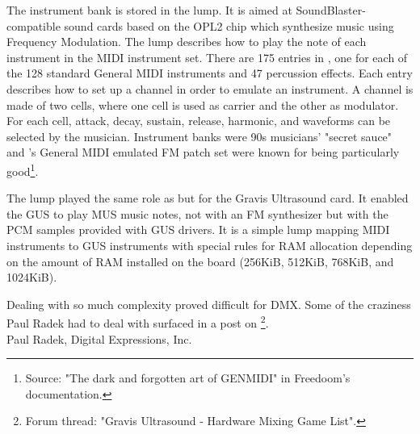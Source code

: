 \par
The instrument bank is stored in the  lump. It is aimed at SoundBlaster-compatible sound cards based on the OPL2 chip which synthesize music using Frequency Modulation. The lump describes how to play the note of each instrument in the MIDI instrument set. There are 175 entries in , one for each of the 128 standard General MIDI instruments and 47 percussion effects. Each entry describes how to set up a channel in order to emulate an instrument. A channel is made of two cells, where one cell is used as carrier and the other as modulator. For each cell, attack, decay, sustain, release, harmonic, and waveforms can be selected by the musician. Instrument banks were 90s musicians' "secret sauce" and \doom's General MIDI emulated FM patch set were known for being particularly good\footnote{Source: "The dark and forgotten art of GENMIDI" in Freedoom's documentation.}.\\
\par
The  lump played the same role as  but for the Gravis Ultrasound card. It enabled the GUS to play MUS music notes, not with an FM synthesizer but with the PCM samples provided with GUS drivers. It is a simple lump mapping MIDI instruments to GUS instruments with special rules for RAM allocation depending on the amount of RAM installed on the board (256KiB, 512KiB, 768KiB, and 1024KiB).\pagebreak



Dealing with so much complexity proved difficult for DMX. Some of the craziness Paul Radek had to deal with surfaced in a post on \footnote{Forum thread: "Gravis Ultrasound - Hardware Mixing Game List".}.\\





{Paul Radek, Digital Expressions, Inc.}\\
\par


